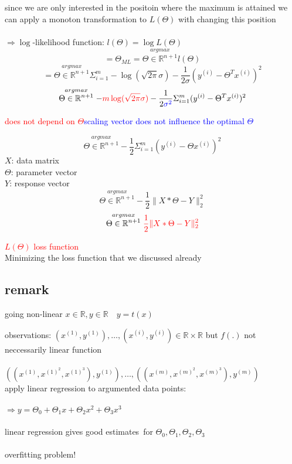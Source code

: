 \begin{enumerate}[(1)]
since we are only interested in the positoin where the maximum is attained we can apply a monoton transformation to $L(\Theta)$ with changing this position\\\\
$\Rightarrow \log$-likelihood function: $l(\Theta) = \log L(\Theta)$
\[ = \Theta_{ML} = \stackrel{argmax}{\Theta \in \mathbb{R}^{n+1}} l(\Theta)\]
\[ = \stackrel{argmax}{\Theta \in \mathbb{R}^{n+1}} \Sigma^m_{i=1} - \log (\sqrt{2\pi}\sigma) - \frac{1}{2\sigma}(y^{(i)} - \Theta^T x^{(i)})^2\]
\[\stackrel{argmax}{\Theta \in \mathbb{R}^{n+1}} - \textcolor{red}{m \log (\sqrt{2\pi}\sigma)} - \frac{1}{2\textcolor{blue}{\sigma^2}}\Sigma^m_{i=1}(y^{(i)} - \Theta^T x^{(i)})^2  \]
\begin{center}
\textcolor{red}{does not depend on $\Theta$}\space\space\space \textcolor{blue}{scaling vector does not influence the optimal $\Theta$}
\end{center}
\[ \stackrel{argmax}{\Theta \in \mathbb{R}^{n+1}} -\frac{1}{2} \Sigma^m_{i=1}(y^{(i)}-\Theta x^{(i)})^2\]
$X$: data matrix\\
$\Theta$: parameter vector\\
$Y$: response vector
\[\stackrel{argmax}{\Theta \in \mathbb{R}^{n+1}} -\frac{1}{2} \lVert X * \Theta - Y \lVert^2_2\]
\[ \stackrel{argmax}{\Theta \in \mathbb{R}^{n+1}} \textcolor{red}{\frac{1}{2} \lVert X * \Theta - Y \lVert^2_2}\]
\begin{center}
\textcolor{red}{$L(\Theta)$ loss function}\\
Minimizing the loss function that we discussed already\\
\end{center}
\end{enumerate}
\subsection*{remark} going non-linear $x \in \mathbb{R}, y \in \mathbb{R} \quad y=t(x)$
\begin{addmargin}[2 cm]{0 cm}
observations: $(x^{(1)}, y^{(1)}), \dots ,(x^{(i)}, y^{(i)}) \in \mathbb{R} \times \mathbb{R}$ but $f(.)$ not neccessarily linear function\\\\
$((x^{(1)},x^{(1)^2}, x^{(1)^3}), y^{(1)}), \dots , ((x^{(m)},x^{(m)^2}, x^{(m)^3}), y^{(m)})$\\
apply linear regression to argumented data points:\\\\
$\Rightarrow y = \Theta_0 + \Theta_1  x + \Theta_2  x^2 + \Theta_3 x^3$\\\\
linear regression gives \glqq good estimates\grqq\ for $\Theta_0, \Theta_1, \Theta_2, \Theta_3$\\\\
overfitting problem!
\end{addmargin} 

